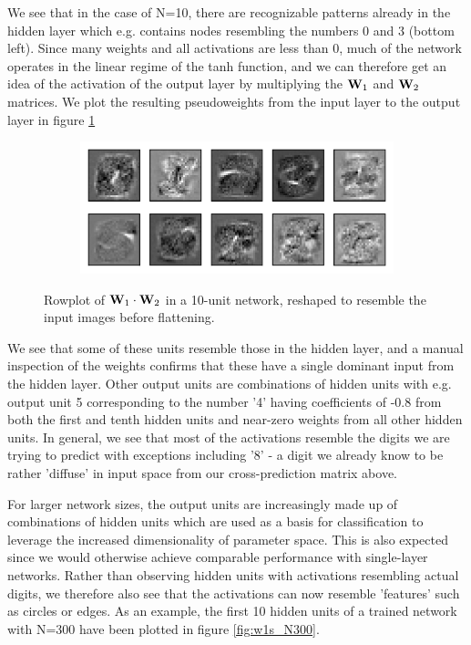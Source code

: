 \documentclass{article}
\begin{document}
We see that in the case of N=10, there are recognizable patterns already in the hidden layer which e.g. contains nodes resembling the numbers 0 and 3 (bottom left). Since many weights and all activations are less than 0, much of the network operates in the linear regime of the tanh function, and we can therefore get an idea of the activation of the output layer by multiplying the ${\bf W}_1$ and ${\bf W}_2$ matrices. We plot the resulting pseudoweights from the input layer to the output layer in figure \ref{fig:w3s_N10}

\begin{figure}[h]
	\centering
	\begin{subfigure}[t]{0.92\linewidth}
		\centering
		\includegraphics[width = 1.0\linewidth, trim={0 0 0 0}, clip=true]{figures/w3s_N10_weightfig.png}
	\end{subfigure}%
\caption{Rowplot of ${\bf W}_1 \cdot {\bf W}_2$ in a 10-unit network, reshaped to resemble the input images before flattening.}
\label{fig:w3s_N10}
\end{figure}


We see that some of these units resemble those in the hidden layer, and a manual inspection of the weights confirms that these have a single dominant input from the hidden layer. Other output units are combinations of hidden units with e.g. output unit 5 corresponding to the number '4' having coefficients of -0.8 from both the first and tenth hidden units and near-zero weights from all other hidden units. In general, we see that most of the activations resemble the digits we are trying to predict with exceptions including '8' - a digit we already know to be rather 'diffuse' in input space from our cross-prediction matrix above.

For larger network sizes, the output units are increasingly made up of combinations of hidden units which are used as a basis for classification to leverage the increased dimensionality of parameter space. This is also expected since we would otherwise achieve comparable performance with single-layer networks.
Rather than observing hidden units with activations resembling actual digits, we therefore also see that the activations can now resemble 'features' such as circles or edges. As an example, the first 10 hidden units of a trained network with N=300 have been plotted in figure \ref{fig:w1s_N300}.
\end{document}
